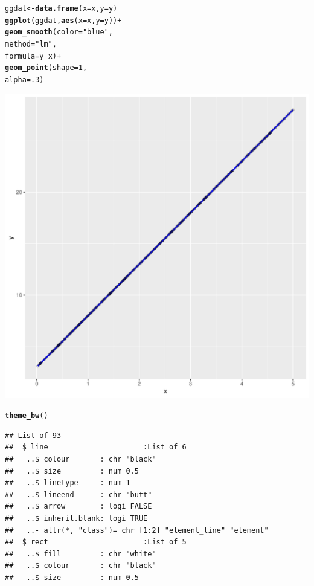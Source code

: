 \documentclass{article}\usepackage[]{graphicx}\usepackage[]{color}
\makeatletter
\def\maxwidth{ %
  \ifdim\Gin@nat@width>\linewidth
    \linewidth
  \else
    \Gin@nat@width
  \fi
}
\newcommand{\hlnum}[1]{\textcolor[rgb]{0.686,0.059,0.569}{#1}}%
\newcommand{\hlstr}[1]{\textcolor[rgb]{0.192,0.494,0.8}{#1}}%
\newcommand{\hlopt}[1]{\textcolor[rgb]{0,0,0}{#1}}%
\newcommand{\hlstd}[1]{\textcolor[rgb]{0.345,0.345,0.345}{#1}}%
\newcommand{\hlkwb}[1]{\textcolor[rgb]{0.69,0.353,0.396}{#1}}%
\newcommand{\hlkwc}[1]{\textcolor[rgb]{0.333,0.667,0.333}{#1}}%
\newcommand{\hlkwd}[1]{\textcolor[rgb]{0.737,0.353,0.396}{\textbf{#1}}}%
\newenvironment{kframe}{%
 \def\at@end@of@kframe{}%
 \ifinner\ifhmode%
  \def\at@end@of@kframe{\end{minipage}}%
  \begin{minipage}{\columnwidth}%
 \fi\fi%
 \def\FrameCommand##1{\hskip\@totalleftmargin \hskip-\fboxsep
 \colorbox{shadecolor}{##1}\hskip-\fboxsep
     \hskip-\linewidth \hskip-\@totalleftmargin \hskip\columnwidth}%
 \MakeFramed {\advance\hsize-\width
   \@totalleftmargin\z@ \linewidth\hsize
   \@setminipage}}%
 {\par\unskip\endMakeFramed%
 \at@end@of@kframe}
\newenvironment{knitrout}{}{} %
\makeatother
\begin{document}
\begin{enumerate}
\begin{enumerate}
\begin{knitrout}
\begin{kframe}
\begin{alltt}
\hlstd{ggdat}\hlkwb{<-}\hlkwd{data.frame}\hlstd{(}\hlkwc{x}\hlstd{=x,} \hlkwc{y}\hlstd{=y)}
\hlkwd{ggplot}\hlstd{(ggdat,} \hlkwd{aes}\hlstd{(}\hlkwc{x}\hlstd{=x,} \hlkwc{y}\hlstd{=y))}\hlopt{+}
  \hlkwd{geom_smooth}\hlstd{(}\hlkwc{color}\hlstd{=}\hlstr{"blue"}\hlstd{,}
              \hlkwc{method}\hlstd{=}\hlstr{"lm"}\hlstd{,}
              \hlkwc{formula}\hlstd{=y}\hlopt{~}\hlstd{x)}\hlopt{+}
  \hlkwd{geom_point}\hlstd{(}\hlkwc{shape}\hlstd{=}\hlnum{1}\hlstd{,}
             \hlkwc{alpha}\hlstd{=}\hlnum{.3}\hlstd{)}
\end{alltt}
\end{kframe}
\includegraphics[width=\maxwidth]{figure/unnamed-chunk-12-1} 
\begin{kframe}\begin{alltt}
  \hlkwd{theme_bw}\hlstd{()}
\end{alltt}
\begin{verbatim}
## List of 93
##  $ line                      :List of 6
##   ..$ colour       : chr "black"
##   ..$ size         : num 0.5
##   ..$ linetype     : num 1
##   ..$ lineend      : chr "butt"
##   ..$ arrow        : logi FALSE
##   ..$ inherit.blank: logi TRUE
##   ..- attr(*, "class")= chr [1:2] "element_line" "element"
##  $ rect                      :List of 5
##   ..$ fill         : chr "white"
##   ..$ colour       : chr "black"
##   ..$ size         : num 0.5

\end{verbatim}
\end{kframe}
\end{knitrout}
\end{enumerate}
\end{enumerate}
\end{document}
